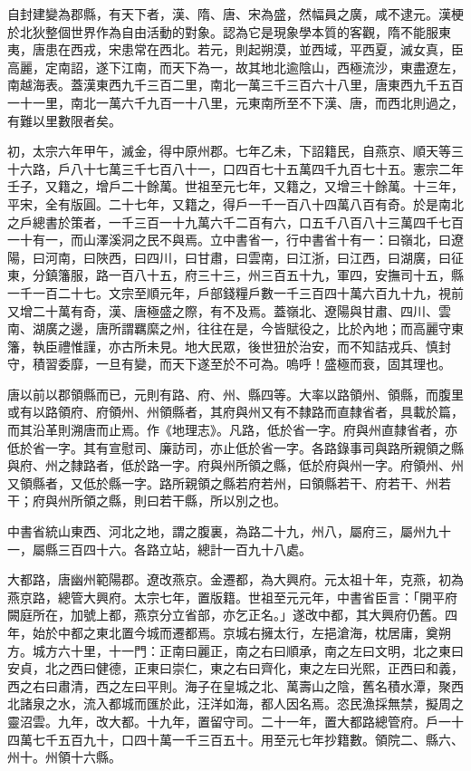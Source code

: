 
\begin{pinyinscope}

 自封建變為郡縣，有天下者，漢、隋、唐、宋為盛，然幅員之廣，咸不逮元。漢梗於北狄整個世界作為自由活動的對象。認為它是現象學本質的客觀，隋不能服東夷，唐患在西戎，宋患常在西北。若元，則起朔漠，並西域，平西夏，滅女真，臣高麗，定南詔，遂下江南，而天下為一，故其地北逾陰山，西極流沙，東盡遼左，南越海表。蓋漢東西九千三百二里，南北一萬三千三百六十八里，唐東西九千五百一十一里，南北一萬六千九百一十八里，元東南所至不下漢、唐，而西北則過之，有難以里數限者矣。



 初，太宗六年甲午，滅金，得中原州郡。七年乙未，下詔籍民，自燕京、順天等三十六路，戶八十七萬三千七百八十一，口四百七十五萬四千九百七十五。憲宗二年壬子，又籍之，增戶二十餘萬。世祖至元七年，又籍之，又增三十餘萬。十三年，平宋，全有版圓。二十七年，又籍之，得戶一千一百八十四萬八百有奇。於是南北之戶總書於策者，一千三百一十九萬六千二百有六，口五千八百八十三萬四千七百一十有一，而山澤溪洞之民不與焉。立中書省一，行中書省十有一：曰嶺北，曰遼陽，曰河南，曰陜西，曰四川，曰甘肅，曰雲南，曰江浙，曰江西，曰湖廣，曰征東，分鎮籓服，路一百八十五，府三十三，州三百五十九，軍四，安撫司十五，縣一千一百二十七。文宗至順元年，戶部錢糧戶數一千三百四十萬六百九十九，視前又增二十萬有奇，漢、唐極盛之際，有不及焉。蓋嶺北、遼陽與甘肅、四川、雲南、湖廣之邊，唐所謂羈縻之州，往往在是，今皆賦役之，比於內地；而高麗守東籓，執臣禮惟謹，亦古所未見。地大民眾，後世狃於治安，而不知詰戎兵、慎封守，積習委靡，一旦有變，而天下遂至於不可為。嗚呼！盛極而衰，固其理也。



 唐以前以郡領縣而已，元則有路、府、州、縣四等。大率以路領州、領縣，而腹里或有以路領府、府領州、州領縣者，其府與州又有不隸路而直隸省者，具載於篇，而其沿革則溯唐而止焉。作《地理志》。凡路，低於省一字。府與州直隸省者，亦低於省一字。其有宣慰司、廉訪司，亦止低於省一字。各路錄事司與路所親領之縣與府、州之隸路者，低於路一字。府與州所領之縣，低於府與州一字。府領州、州又領縣者，又低於縣一字。路所親領之縣若府若州，曰領縣若干、府若干、州若干；府與州所領之縣，則曰若干縣，所以別之也。



 中書省統山東西、河北之地，謂之腹裏，為路二十九，州八，屬府三，屬州九十一，屬縣三百四十六。各路立站，總計一百九十八處。



 大都路，唐幽州範陽郡。遼改燕京。金遷都，為大興府。元太祖十年，克燕，初為燕京路，總管大興府。太宗七年，置版籍。世祖至元元年，中書省臣言：「開平府闕庭所在，加號上都，燕京分立省部，亦乞正名。」遂改中都，其大興府仍舊。四年，始於中都之東北置今城而遷都焉。京城右擁太行，左挹滄海，枕居庸，奠朔方。城方六十里，十一門：正南曰麗正，南之右曰順承，南之左曰文明，北之東曰安貞，北之西曰健德，正東曰崇仁，東之右曰齊化，東之左曰光熙，正西曰和義，西之右曰肅清，西之左曰平則。海子在皇城之北、萬壽山之陰，舊名積水潭，聚西北諸泉之水，流入都城而匯於此，汪洋如海，都人因名焉。恣民漁採無禁，擬周之靈沼雲。九年，改大都。十九年，置留守司。二十一年，置大都路總管府。戶一十四萬七千五百九十，口四十萬一千三百五十。用至元七年抄籍數。領院二、縣六、州十。州領十六縣。




\end{pinyinscope}
